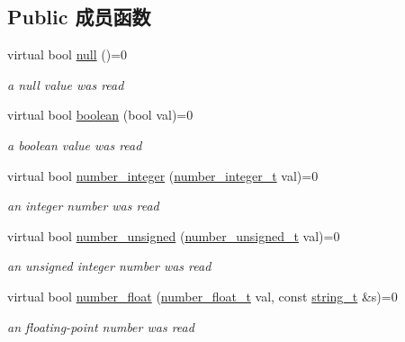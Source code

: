 \subsection*{Public 成员函数}
\begin{DoxyCompactItemize}
\item 
virtual bool \mbox{\hyperlink{structnlohmann_1_1json__sax_a0ad26edef3f8d530dcec3192bba82df6}{null}} ()=0
\begin{DoxyCompactList}\small\item\em a null value was read \end{DoxyCompactList}\item 
virtual bool \mbox{\hyperlink{structnlohmann_1_1json__sax_a82ed080814fa656191a537284bb0c575}{boolean}} (bool val)=0
\begin{DoxyCompactList}\small\item\em a boolean value was read \end{DoxyCompactList}\item 
virtual bool \mbox{\hyperlink{structnlohmann_1_1json__sax_affa7a78b8e9cc9cc3ac99927143142a5}{number\+\_\+integer}} (\mbox{\hyperlink{structnlohmann_1_1json__sax_a0cef30121f02b7fee85e9708148ea0aa}{number\+\_\+integer\+\_\+t}} val)=0
\begin{DoxyCompactList}\small\item\em an integer number was read \end{DoxyCompactList}\item 
virtual bool \mbox{\hyperlink{structnlohmann_1_1json__sax_ad9b253083e0509923ba195136f49face}{number\+\_\+unsigned}} (\mbox{\hyperlink{structnlohmann_1_1json__sax_a32028cc056ae0f43aaae331cdbbbf856}{number\+\_\+unsigned\+\_\+t}} val)=0
\begin{DoxyCompactList}\small\item\em an unsigned integer number was read \end{DoxyCompactList}\item 
virtual bool \mbox{\hyperlink{structnlohmann_1_1json__sax_ae7c31614e8a82164d2d7f8dbf4671b25}{number\+\_\+float}} (\mbox{\hyperlink{structnlohmann_1_1json__sax_a390c209bffd8c4800c8f3076dc465a20}{number\+\_\+float\+\_\+t}} val, const \mbox{\hyperlink{structnlohmann_1_1json__sax_ae01977a9f3c5b3667b7a2929ed91061e}{string\+\_\+t}} \&s)=0
\begin{DoxyCompactList}\small\item\em an floating-\/point number was read \end{DoxyCompactList}\item 

\end{DoxyCompactItemize}
